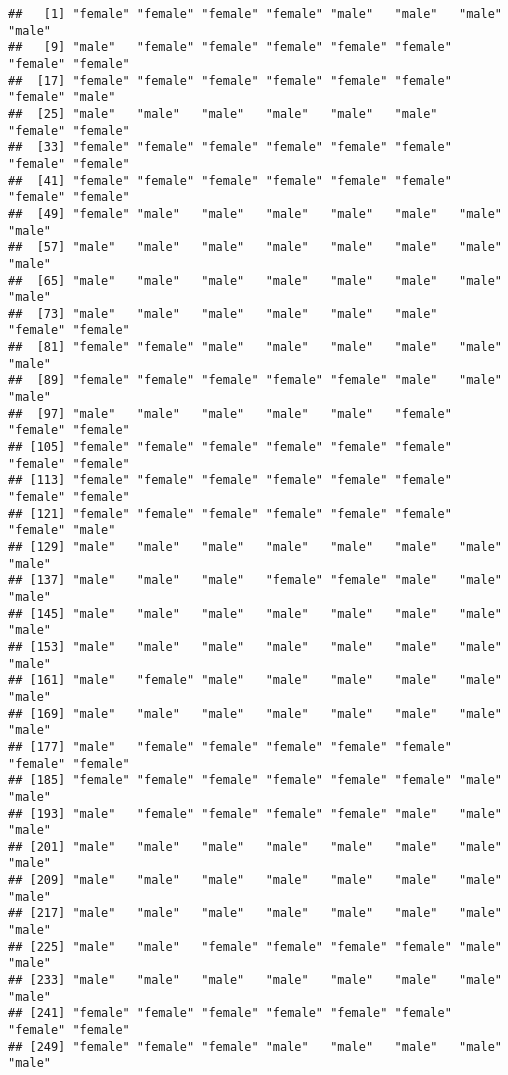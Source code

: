 \documentclass[
]{article}
\begin{document}
\begin{verbatim}
##   [1] "female" "female" "female" "female" "male"   "male"   "male"   "male"  
##   [9] "male"   "female" "female" "female" "female" "female" "female" "female"
##  [17] "female" "female" "female" "female" "female" "female" "female" "male"  
##  [25] "male"   "male"   "male"   "male"   "male"   "male"   "female" "female"
##  [33] "female" "female" "female" "female" "female" "female" "female" "female"
##  [41] "female" "female" "female" "female" "female" "female" "female" "female"
##  [49] "female" "male"   "male"   "male"   "male"   "male"   "male"   "male"  
##  [57] "male"   "male"   "male"   "male"   "male"   "male"   "male"   "male"  
##  [65] "male"   "male"   "male"   "male"   "male"   "male"   "male"   "male"  
##  [73] "male"   "male"   "male"   "male"   "male"   "male"   "female" "female"
##  [81] "female" "female" "male"   "male"   "male"   "male"   "male"   "male"  
##  [89] "female" "female" "female" "female" "female" "male"   "male"   "male"  
##  [97] "male"   "male"   "male"   "male"   "male"   "female" "female" "female"
## [105] "female" "female" "female" "female" "female" "female" "female" "female"
## [113] "female" "female" "female" "female" "female" "female" "female" "female"
## [121] "female" "female" "female" "female" "female" "female" "female" "male"  
## [129] "male"   "male"   "male"   "male"   "male"   "male"   "male"   "male"  
## [137] "male"   "male"   "male"   "female" "female" "male"   "male"   "male"  
## [145] "male"   "male"   "male"   "male"   "male"   "male"   "male"   "male"  
## [153] "male"   "male"   "male"   "male"   "male"   "male"   "male"   "male"  
## [161] "male"   "female" "male"   "male"   "male"   "male"   "male"   "male"  
## [169] "male"   "male"   "male"   "male"   "male"   "male"   "male"   "male"  
## [177] "male"   "female" "female" "female" "female" "female" "female" "female"
## [185] "female" "female" "female" "female" "female" "female" "male"   "male"  
## [193] "male"   "female" "female" "female" "female" "male"   "male"   "male"  
## [201] "male"   "male"   "male"   "male"   "male"   "male"   "male"   "male"  
## [209] "male"   "male"   "male"   "male"   "male"   "male"   "male"   "male"  
## [217] "male"   "male"   "male"   "male"   "male"   "male"   "male"   "male"  
## [225] "male"   "male"   "female" "female" "female" "female" "male"   "male"  
## [233] "male"   "male"   "male"   "male"   "male"   "male"   "male"   "male"  
## [241] "female" "female" "female" "female" "female" "female" "female" "female"
## [249] "female" "female" "female" "male"   "male"   "male"   "male"   "male"  

\end{verbatim}
\end{document}
